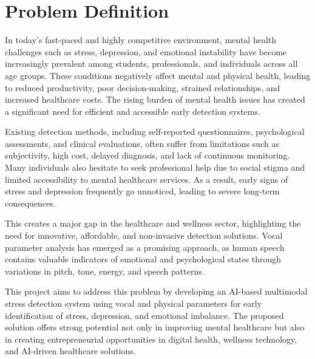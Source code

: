 
\chapter{Problem Definition}

In today's fast-paced and highly competitive environment, mental health challenges such as stress, depression, and emotional instability have become increasingly prevalent among students, professionals, and individuals across all age groups. These conditions negatively affect mental and physical health, leading to reduced productivity, poor decision-making, strained relationships, and increased healthcare costs. The rising burden of mental health issues has created a significant need for efficient and accessible early detection systems.

Existing detection methods, including self-reported questionnaires, psychological assessments, and clinical evaluations, often suffer from limitations such as subjectivity, high cost, delayed diagnosis, and lack of continuous monitoring. Many individuals also hesitate to seek professional help due to social stigma and limited accessibility to mental healthcare services. As a result, early signs of stress and depression frequently go unnoticed, leading to severe long-term consequences.

This creates a major gap in the healthcare and wellness sector, highlighting the need for innovative, affordable, and non-invasive detection solutions. Vocal parameter analysis has emerged as a promising approach, as human speech contains valuable indicators of emotional and psychological states through variations in pitch, tone, energy, and speech patterns.

This project aims to address this problem by developing an AI-based multimodal stress detection system using vocal and physical parameters for early identification of stress, depression, and emotional imbalance. The proposed solution offers strong potential not only in improving mental healthcare but also in creating entrepreneurial opportunities in digital health, wellness technology, and AI-driven healthcare solutions.
